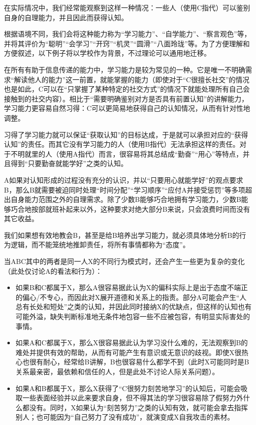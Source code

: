 在实际情况中，我们经常能观察到这样一种情况：一些人（使用C指代）可以鉴别自身的自理能力，并且因此而获得认知。
\begin{explain}
根据语境不同，我们会将这种能力称为“学习能力”、“自学能力”、“察言观色”等，并将其评价为“聪明”“会学习”“开窍”“机灵”“圆滑”“八面玲珑”等。为了方便理解和方便叙述，以下例子将以学校作为背景，不过理论可以通用地迁移。

在所有有助于信息传递的能力中，学习能力是较为常见的一种。它是唯一不明确需求“解读他人的能力”这一前置，就能掌握的能力（即使对于“C很擅长社交”的情况也是如此，C可以在“只掌握了某种特定的社交方式”的情况下就能处理所有自己会接触到的社交内容）。相比于“需要明确鉴别对方是否具有前置认知”的讲解能力，学习能力更容易自然习得：C可以更简易地获得自己的认知情况，从而有针对性地调整。

习得了学习能力就可以保证“获取认知”的目标达成，于是就可以承担对应的“获得认知”的责任。而其它没有学习能力的人（使用B指代）无法承担这样的责任。对于不明就里的人（使用A指代）而言，很容易将其总结成“勤奋”“用心”等特点，并且得到“只要勤奋就能学好”之类的认知。

A如果对认知形成的过程没有充分的认识，并以“只要用心就能学好”的观点要求B，那么B就需要被迫同时处理“时间分配”“学习顺序”“应付A并接受惩罚”等多项超出自身能力范围之外的自理需求。除了少数B能够巧合地拥有学习能力，少数B能够巧合地按部就班补起来以外，这种要求对绝大部分B来说，只会浪费时间而没有其它收益。

我们如果想有效地教会B，甚至是给B培养出学习能力，就必须具体地分析B的行为逻辑，而不能笼统地推卸责任，将所有事情都称为“态度”。

当ABC其中的两者是同一人X的不同行为模式时，还会产生一些更为复杂的变化（此处仅讨论A的看法和行为）：
\begin{itemize}
\item 如果B和C都属于X，那么A很容易据此认为X的偏科实际上是出于态度不端正的偏心/不专心，而因此对X展开道德和关系上的指责。部分A可能会产生“人总有长处和短处”之类的认知，并因此同时接纳X的优缺点，但这样的认知也有可能外溢，缺失判断标准地无条件地包容一些不应被包容，有明显实际害处的事情。

\item 如果A和C都属于X，那么X很容易据此认为学习没什么难的，无法观察到B的难处并提供有效的帮助，从而有可能产生有意识或无意识的歧视。即使X很热心也很有耐心，经常给B讲解，B也很容易什么都学不到（此时X可能同时是B关系最亲密，最依赖和信任的人，但是此处不讨论人际关系问题）。

\item 如果A和B都属于X，那么X获得了“C很努力刻苦地学习”的认知后，可能会吸取一些表面经验并以此来要求自身，但不得其法的学习很容易除了假努力外什么都没有。同时，X如果认为“刻苦努力”之类的认知有效，就可能会拿去指挥别人；也可能因为“自己努力了没有成功”，就演变成X自我攻击的素材。
\end{itemize}
\end{explain}

